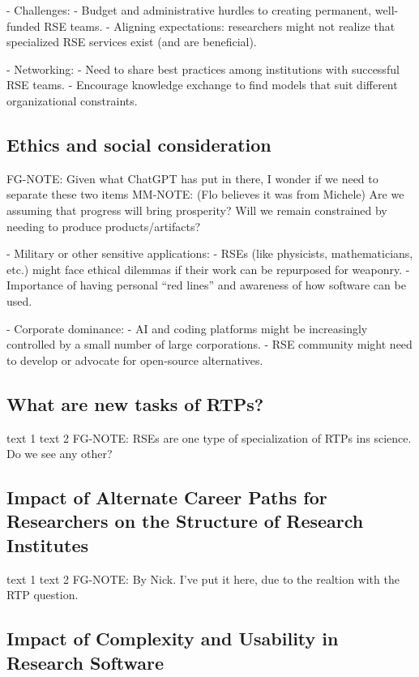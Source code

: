 \documentclass{eceasst}
\begin{document}
- Challenges:
  - Budget and administrative hurdles to creating permanent, well-funded RSE teams.
  - Aligning expectations: researchers might not realize that specialized RSE services exist (and are beneficial).

- Networking:
  - Need to share best practices among institutions with successful RSE teams.
  - Encourage knowledge exchange to find models that suit different organizational constraints.

\subsection{Ethics and social consideration}
FG-NOTE: Given what ChatGPT has put in there, I wonder if we need to separate these two items
MM-NOTE: (Flo believes it was from Michele) Are we assuming that progress will bring prosperity? Will we remain constrained by needing to produce products/artifacts?

- Military or other sensitive applications:
  - RSEs (like physicists, mathematicians, etc.) might face ethical dilemmas if their work can be repurposed for weaponry.
  - Importance of having personal “red lines” and awareness of how software can be used.

- Corporate dominance:
  - AI and coding platforms might be increasingly controlled by a small number of large corporations.
  - RSE community might need to develop or advocate for open-source alternatives.


\subsection{What are new tasks of RTPs?}
\begin{story}{text 1 }{text 2}
 FG-NOTE: RSEs are one type of specialization of RTPs ins science. Do we see any other?
\end{story}

\subsection{Impact of Alternate Career Paths for Researchers on the Structure of Research Institutes}
\begin{whatis}{text 1 }{text 2}
FG-NOTE: By Nick. I've put it here, due to the realtion with the RTP question.
\end{whatis}



\subsection{Impact of Complexity and Usability in Research Software}
\end{document}
